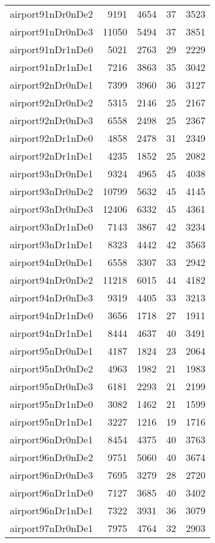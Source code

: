 \documentclass[../../../thesis.tex]{subfiles}
\begin{document}
\begin{longtable}{lrrrr}
airport91nDr0nDe2 & 9191 & 4654 & 37 & 3523 \\
airport91nDr0nDe3 & 11050 & 5494 & 37 & 3851 \\
airport91nDr1nDe0 & 5021 & 2763 & 29 & 2229 \\
airport91nDr1nDe1 & 7216 & 3863 & 35 & 3042 \\
airport92nDr0nDe1 & 7399 & 3960 & 36 & 3127 \\
airport92nDr0nDe2 & 5315 & 2146 & 25 & 2167 \\
airport92nDr0nDe3 & 6558 & 2498 & 25 & 2367 \\
airport92nDr1nDe0 & 4858 & 2478 & 31 & 2349 \\
airport92nDr1nDe1 & 4235 & 1852 & 25 & 2082 \\
airport93nDr0nDe1 & 9324 & 4965 & 45 & 4038 \\
airport93nDr0nDe2 & 10799 & 5632 & 45 & 4145 \\
airport93nDr0nDe3 & 12406 & 6332 & 45 & 4361 \\
airport93nDr1nDe0 & 7143 & 3867 & 42 & 3234 \\
airport93nDr1nDe1 & 8323 & 4442 & 42 & 3563 \\
airport94nDr0nDe1 & 6558 & 3307 & 33 & 2942 \\
airport94nDr0nDe2 & 11218 & 6015 & 44 & 4182 \\
airport94nDr0nDe3 & 9319 & 4405 & 33 & 3213 \\
airport94nDr1nDe0 & 3656 & 1718 & 27 & 1911 \\
airport94nDr1nDe1 & 8444 & 4637 & 40 & 3491 \\
airport95nDr0nDe1 & 4187 & 1824 & 23 & 2064 \\
airport95nDr0nDe2 & 4963 & 1982 & 21 & 1983 \\
airport95nDr0nDe3 & 6181 & 2293 & 21 & 2199 \\
airport95nDr1nDe0 & 3082 & 1462 & 21 & 1599 \\
airport95nDr1nDe1 & 3227 & 1216 & 19 & 1716 \\
airport96nDr0nDe1 & 8454 & 4375 & 40 & 3763 \\
airport96nDr0nDe2 & 9751 & 5060 & 40 & 3674 \\
airport96nDr0nDe3 & 7695 & 3279 & 28 & 2720 \\
airport96nDr1nDe0 & 7127 & 3685 & 40 & 3402 \\
airport96nDr1nDe1 & 7322 & 3931 & 36 & 3079 \\
airport97nDr0nDe1 & 7975 & 4764 & 32 & 2903 \\

\end{longtable}
\end{document}
